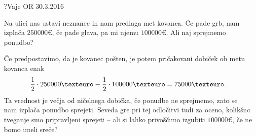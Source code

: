 
\begin{naloga}{?}{Vaje OR 30.3.2016}
\begin{vprasanje}
Na ulici nas ustavi neznanec in nam predlaga met kovanca.
Če pade grb, nam izplača $250000 €$,
če pade glava, pa mi njemu $100000 €$.
Ali naj sprejmemo ponudbo?
\end{vprasanje}

\begin{odgovor}
Če predpostavimo, da je kovanec pošten,
je potem pričakovani dobiček ob metu kovanca enak
$$
{1 \over 2} \cdot 250000 € - {1 \over 2} \cdot 100000 € = 75000 € .
$$
Ta vrednost je večja od ničelnega dobička, če ponudbe ne sprejmemo,
zato se nam izplača ponudbo sprejeti.
Seveda gre pri tej odločitvi tudi za oceno,
kolikšno tveganje smo pripravljeni sprejeti
-- ali si lahko privoščimo izgubiti $100000 €$, če ne bomo imeli sreče?
\end{odgovor}
\end{naloga}


